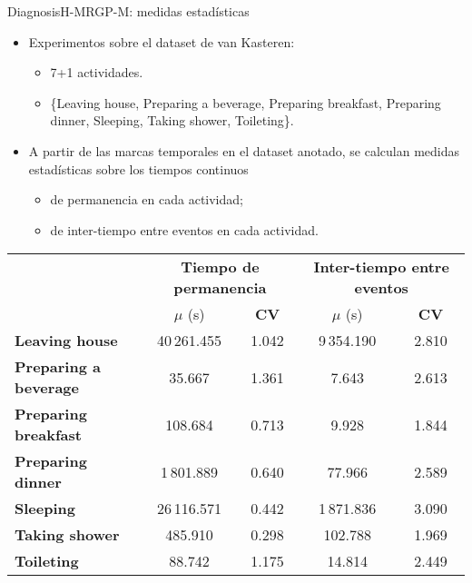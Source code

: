 \documentclass[9pt, handout]{beamer}
\begin{document}
      \begin{frame}{Diagnosis}{H-MRGP-M: medidas estadísticas}
        \pause
        \begin{itemize}
          \item Experimentos sobre el dataset de van Kasteren:
          \begin{itemize}
            \item 7+1 actividades.
            \item \{Leaving house, Preparing a beverage, Preparing breakfast, Preparing dinner, Sleeping, Taking shower, Toileting\}.
          \end{itemize}
          \pause
          \item A partir de las marcas temporales en el dataset anotado, se calculan medidas estadísticas sobre los tiempos continuos
          \begin{itemize}
            \item de permanencia en cada actividad;
            \item de inter-tiempo entre eventos en cada actividad.
          \end{itemize}
        \end{itemize}
        
        \pause
    		\begin{table}[h!]
    			\centering
    			\small
    			\setlength{\tabcolsep}{5pt}
    			\def\arraystretch{0.75}
    			\begin{tabular}{| l | c | c || c | c |}
    				\hline
    				& \multicolumn{2}{|c||}{\bf Tiempo de permanencia}& \multicolumn{2}{|c|}{\bf Inter-tiempo entre eventos}\\
    				\cline{2-5}
    				& $\mu$ (s) & {\bf CV} & $\mu$ (s) & {\bf CV}\\
    				\hline
    				{\bf Leaving house} & 40\,261.455 & 1.042 & 9\,354.190 & 2.810 \\ \hline
    				{\bf Preparing a beverage} &  35.667 & 1.361 & 7.643 & 2.613\\ \hline
    				{\bf Preparing breakfast} &  108.684 & 0.713 & 9.928 & 1.844\\ \hline
    				{\bf Preparing dinner} &  1\,801.889 & 0.640 & 77.966 & 2.589\\ \hline
    				{\bf Sleeping} &  26\,116.571 & 0.442 & 1\,871.836 & 3.090\\ \hline
    				{\bf Taking shower} &  485.910 & 0.298 & 102.788 & 1.969\\ \hline
    				{\bf Toileting} &  88.742 & 1.175 & 14.814 & 2.449\\ 
    				\hline
      		\end{tabular}
    		\end{table}
      \end{frame}
      
\end{document}
